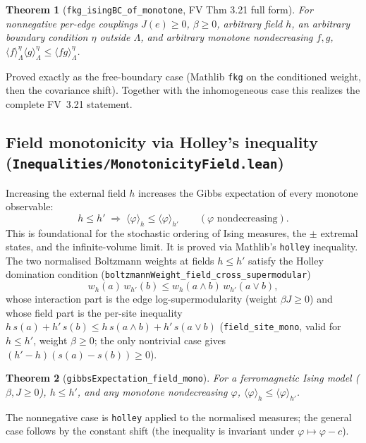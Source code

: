 \documentclass[a4paper,11pt]{article}
\newtheorem{theorem}{Theorem}
\begin{document}
\begin{theorem}[\texttt{fkg\_isingBC\_of\_monotone}, FV Thm 3.21 full form]
For nonnegative per-edge couplings $J(e) \ge 0$, $\beta \ge 0$, arbitrary field
$h$, an arbitrary boundary condition $\eta$ outside $\Lambda$, and arbitrary
monotone nondecreasing $f, g$,
$\langle f \rangle^{\eta}_\Lambda \langle g \rangle^{\eta}_\Lambda
  \le \langle fg \rangle^{\eta}_\Lambda$.
\end{theorem}

\noindent Proved exactly as the free-boundary case (Mathlib \texttt{fkg} on the
conditioned weight, then the covariance shift). Together with the inhomogeneous
case this realizes the complete FV~3.21 statement.

\subsection{Field monotonicity via Holley's inequality
(\texttt{Inequalities/MonotonicityField.lean})}

Increasing the external field $h$ increases the Gibbs expectation of every
monotone observable:
\[
  h \le h' \;\Longrightarrow\; \langle \varphi \rangle_h \le \langle \varphi
  \rangle_{h'}
  \qquad (\varphi \text{ nondecreasing}).
\]
This is foundational for the stochastic ordering of Ising measures, the $\pm$
extremal states, and the infinite-volume limit. It is proved via Mathlib's
\texttt{holley} inequality. The two normalised Boltzmann weights at fields
$h \le h'$ satisfy the Holley domination condition
(\texttt{boltzmannWeight\_field\_cross\_supermodular})
\[
  w_h(a)\, w_{h'}(b) \le w_h(a \wedge b)\, w_{h'}(a \vee b),
\]
whose interaction part is the edge log-supermodularity (weight $\beta J \ge 0$)
and whose field part is the per-site inequality
$h\, s(a) + h'\, s(b) \le h\, s(a \wedge b) + h'\, s(a \vee b)$
(\texttt{field\_site\_mono}, valid for $h \le h'$, weight $\beta \ge 0$; the only
nontrivial case gives $(h'-h)(s(a)-s(b)) \ge 0$).

\begin{theorem}[\texttt{gibbsExpectation\_field\_mono}]
For a ferromagnetic Ising model ($\beta, J \ge 0$), $h \le h'$, and any monotone
nondecreasing $\varphi$,
$\langle \varphi \rangle_h \le \langle \varphi \rangle_{h'}$.
\end{theorem}

\noindent The nonnegative case is \texttt{holley} applied to the normalised
measures; the general case follows by the constant shift (the inequality is
invariant under $\varphi \mapsto \varphi - c$).
\end{document}
